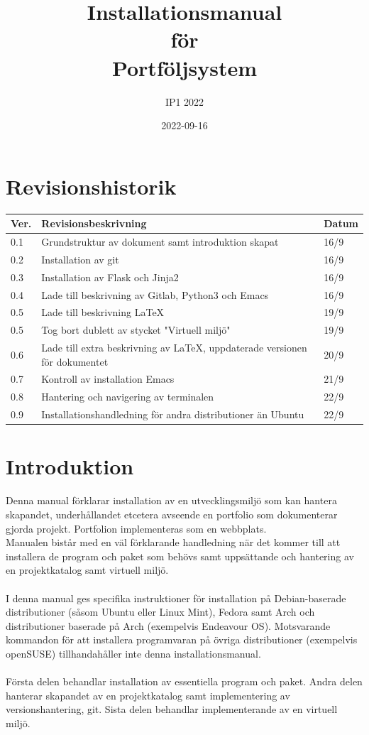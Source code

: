 \documentclass{TDP003mall}
\author{IP1 2022}
\title{Installationsmanual\\för\\ Portföljsystem}
\date{2022-09-16}
\begin{document}
\projectpage
\section*{Revisionshistorik}
\begin{table}[!h]
\begin{tabularx}{\linewidth}{|l|X|l|}
\hline
Ver. & Revisionsbeskrivning & Datum \\\hline
0.1 & Grundstruktur av dokument samt introduktion skapat & 16/9 \\\hline
0.2 & Installation av git & 16/9 \\\hline
0.3 & Installation av Flask och Jinja2 & 16/9 \\\hline
0.4 & Lade till beskrivning av Gitlab, Python3 och Emacs & 16/9 \\\hline
0.5 & Lade till beskrivning LaTeX & 19/9 \\\hline
0.5 & Tog bort dublett av stycket "Virtuell miljö" & 19/9 \\\hline
0.6 & Lade till extra beskrivning av LaTeX, uppdaterade versionen för dokumentet & 20/9\\\hline
0.7 & Kontroll av installation Emacs & 21/9\\\hline
0.8 & Hantering och navigering av terminalen & 22/9\\\hline
0.9 & Installationshandledning för andra distributioner än Ubuntu & 22/9\\\hline
\end{tabularx}
\end{table}


\section*{Introduktion}
Denna manual förklarar installation av en utvecklingsmiljö som kan hantera skapandet, underhållandet etcetera avseende
en portfolio som dokumenterar gjorda projekt. Portfolion implementeras som en webbplats.\\
Manualen bistår med en väl förklarande handledning när det kommer till att installera de program och paket som behövs
samt uppsättande och hantering av en projektkatalog samt virtuell miljö.\\\\ I denna manual ges specifika instruktioner för installation på Debian-baserade distributioner (såsom Ubuntu eller Linux Mint), Fedora samt Arch och distributioner baserade på Arch (exempelvis Endeavour OS). Motsvarande kommandon för att installera programvaran på övriga distributioner (exempelvis openSUSE) tillhandahåller inte denna installationsmanual.\\\\
Första delen behandlar installation av essentiella program och paket. Andra delen hanterar skapandet av en projektkatalog
samt implementering av versionshantering, git. Sista delen behandlar implementerande av en virtuell miljö.
\end{document}
